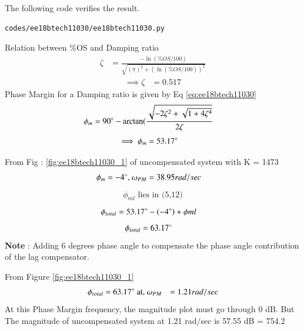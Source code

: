 \begin{enumerate}[label=\thesubsection.\arabic*.,ref=\thesubsection.\theenumi]
The following code verifies the result.
\begin{lstlisting}
codes/ee18btech11030/ee18btech11030.py
\end{lstlisting}
%

Relation between \%OS and Damping ratio
\begin{align}
\zeta &= \frac{-\ln(\%OS/100)}{\sqrt{(\pi)^2 + (\ln(\%OS/100))^2}}
\end{align}
\begin{align}
\implies\zeta &= 0.517 
\end{align}
Phase Margin for a Damping ratio is given by Eq \eqref{eq:ee18btech11030}  
\begin{align}
\label{eq:ee18btech11030}
\phi_{m} &= 90\degree - \arctan(\frac{\sqrt{-2\zeta^2+\sqrt{1+4\zeta^4}}}{2\zeta}
\end{align}
\begin{align}
\implies \phi_{m} &= 53.17\degree
\end{align}

From Fig : \ref{fig:ee18btech11030_1} of uncompensated system with K = 1473 
\begin{align}
\phi_{m} = -4\degree \text{, } \omega_{PM} &= 38.95 rad/sec
\end{align}
\begin{align}
\phi_{ml}\text{ lies in (5,12)}
\end{align}
\begin{align}
     \phi_{total} & = 53.17\degree  -(-4\degree ) + \phi{ml}
\end{align}
\begin{align}
    \phi_{total} &= 63.17\degree
\end{align}
\textbf{Note} : Adding 6 degrees phase angle to compensate the phase angle contribution of the lag compensator.

From Figure \ref{fig:ee18btech11030_1} 
\begin{align}
     \phi_{total} & = 63.17\degree \text{ at, } \omega_{PM} &= 1.21 rad/sec
\end{align}
At this Phase Margin frequency, the magnitude plot must go through 0 dB. But The magnitude of uncompensated system at 1.21 rad/sec is 57.55 dB = 754.2  


\end{enumerate}
